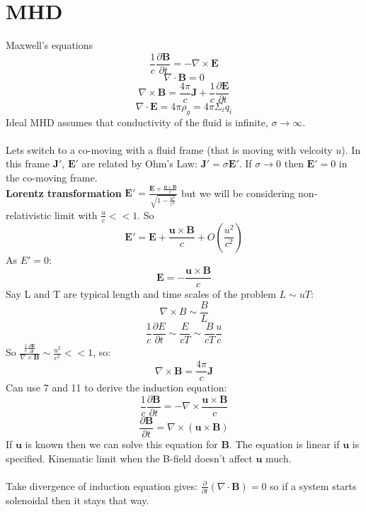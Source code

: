 \documentclass{article}
\begin{document}
{\section{MHD}
Maxwell's equations
\begin{equation}
        \frac{1}{c} \frac{\partial \bm B}{\partial t} = - \nabla \times \bm E
\end{equation}
\begin{equation}
        \nabla \cdot \bm B = 0
\end{equation}
\begin{equation}
        \nabla \times \bm B = \frac{4 \pi}{c} \bm J + \frac{1}{c}\frac{\partial \bm E}{\partial t}
\end{equation}
\begin{equation}
        \nabla \cdot \bm E = 4 \pi \rho_{g} = 4\pi \Sigma_i q_i
\end{equation}
Ideal MHD assumes that conductivity of the fluid is infinite, $\sigma \rightarrow \infty$.\\\\
Lets switch to a co-moving with a fluid frame (that is moving with velcoity $u$). In this frame $\bm J'$, $\bm E'$ are related by Ohm's Law: $\bm J' = \sigma \bm E'$. If $\sigma \rightarrow 0$ then $\bm E' = 0$ in the co-moving frame.\\
\textbf{Lorentz transformation}
$\bm E' = \frac{\bm E + \frac{\bm u \times \bm B}{c}}{\sqrt{1-\frac{u^2}{c^2}}}$ but we will be considering non-relativistic limit with $\frac{u}{c} <<1$. So 
$$
\bm E' = \bm E + \frac{\bm u \times \bm B}{c} + O(\frac{u^2}{c^2})
$$
As $E'=0$:
\begin{equation}
        \bm E = -\frac{\bm u \times \bm B}{c}
\end{equation}
Say L and T are typical length and time scales of the problem $L \sim u T$:
$$
\nabla \times B \sim \frac{B}{L}
$$
$$
\frac{1}{c}\frac{\partial E}{\partial t} \sim \frac{E}{cT} \sim \frac{B}{cT}\frac{u}{c}
$$
So $\frac{\frac{1}{c}\frac{\partial \bm E}{\partial t}}{\nabla \times \bm B} \sim \frac{u^2}{c^2} << 1$, so:
\begin{equation}
        \nabla \times \bm B = \frac{4 \pi}{c} \bm J 
\end{equation}
Can use 7 and 11 to derive the induction equation:
$$
\frac{1}{c} \frac{\partial \bm B}{\partial t} = - \nabla \times \frac{\bm u \times \bm B}{c}
$$
\begin{equation}
        \frac{\partial \bm B}{\partial t} = \nabla \times (\bm u \times \bm B)
\end{equation}
If $\bm u$ is known then we can solve this equation for $\bm B$. The equation is linear if $\bm u$ is specified. Kinematic limit when the B-field doesn't affect $\bm u$ much.\\\\
Take divergence of induction equation gives: $\frac{\partial}{\partial t}(\nabla \cdot \bm B) = 0$ so if a system starts solenoidal then it stays that way.
}
\end{document}
